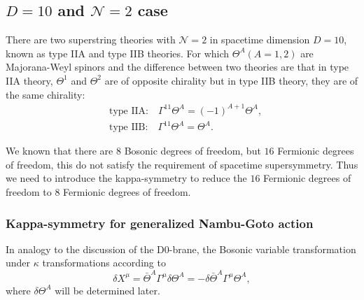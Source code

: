 \documentclass[graybox,envcountchap,sectrefs]{svmono}
\begin{document}
\subsection{$D=10$ and $\mathcal{N}=2$ case}

There are two superstring theories with $\mathcal{N}=2$ in spacetime dimension $D=10$, known as type IIA and type IIB theories. For which $\Theta^A (A=1,2)$ are Majorana-Weyl spinors and the difference between two theories are that in type IIA theory, $\Theta^1$ and $\Theta^2$ are of opposite chirality but in type IIB theory, they are of the same chirality:
\begin{align}
&\text{type IIA:}\quad \Gamma^{11}\Theta^A= (-1)^{A+1}\Theta^A,\\
&\text{type IIB:} \quad \Gamma^{11}\Theta^A=\Theta^A.
\end{align}


We known that there are $8$ Bosonic degrees of freedom, but $16$ Fermionic degrees of freedom, this do not satisfy the requirement of spacetime supersymmetry.
Thus we need to introduce the kappa-symmetry to reduce the  $16$ Fermionic degrees of freedom to $8$ Fermionic degrees of freedom.

\subsubsection*{Kappa-symmetry for generalized Nambu-Goto action}

In analogy to the discussion of the D0-brane, the Bosonic variable transformation under $\kappa$ transformations according to
\begin{equation}
\delta X^{\mu}=\bar{\Theta}^{A} \Gamma^{\mu} \delta \Theta^{A}=-\delta \bar{\Theta}^{A} \Gamma^{\mu} \Theta^{A},
\end{equation}
where $\delta \Theta^{A}$ will be determined later.
\end{document}
